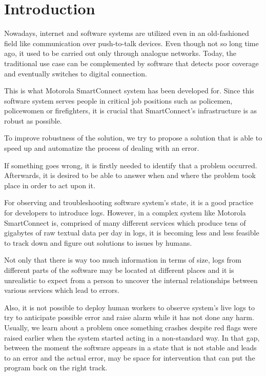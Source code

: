 
\chapter{Introduction}
\label{introduction}

Nowadays, internet and software systems are utilized even in an old-fashioned field like communication over push-to-talk devices. Even though not so long time ago, it used to be carried out only through analogue networks. Today, the traditional use case can be complemented by software that detects poor coverage and eventually switches to digital connection. 

This is what Motorola SmartConnect system has been developed for. 
Since this software system serves people in critical job positions such as policemen, policewomen or firefighters, it is crucial that SmartConnect's infrastructure is as robust as possible.

To improve robustness of the solution, we try to propose a solution that is able to speed up and automatize the process of dealing with an error.

If something goes wrong, it is firstly needed to identify that a problem occurred. 
Afterwards, it is desired to be able to answer when and where the problem took place in order to act upon it.

For observing and troubleshooting software system's state, it is a good practice for developers to introduce logs.
However, in a complex system like Motorola SmartConnect is, comprised of many different services which produce tens of gigabytes of raw textual data per day in logs, it is becoming less and less feasible to track down and figure out solutions to issues by humans.

Not only that there is way too much information in terms of size, logs from different parts of the software may be located at different places and it is unrealistic to expect from a person to uncover the internal relationships between various services which lead to errors.

Also, it is not possible to deploy human workers to observe system's live logs to try to anticipate possible error and raise alarm while it has not done any harm. 
Usually, we learn about a problem once something crashes despite red flags were raised earlier when the system started acting in a non-standard way. In that gap, between the moment the software appears in a state that is not stable and leads to an error and the actual error, may be space for intervention that can put the program back on the right track.

